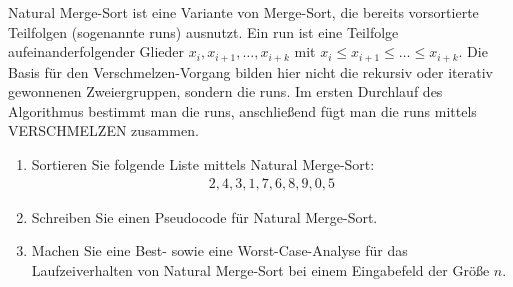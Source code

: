 
\begin{exercise}

Natural Merge-Sort ist eine Variante von Merge-Sort, die bereits vorsortierte Teilfolgen
(sogenannte runs) ausnutzt. Ein run ist eine Teilfolge aufeinanderfolgender Glieder $x_i, x_{i+1}, \dots, x_{i+k}$ mit $x_i \leq x_{i+1} \leq \dots \leq x_{i+k}$. Die Basis für den Verschmelzen-Vorgang bilden hier nicht
die rekursiv oder iterativ gewonnenen Zweiergruppen, sondern die runs. Im ersten Durchlauf des Algorithmus
bestimmt man die runs, anschließend fügt man die runs mittels VERSCHMELZEN zusammen.

\begin{enumerate}[label = (\alph*)]
  \item Sortieren Sie folgende Liste mittels Natural Merge-Sort:
  \begin{align}
    2,4,3,1,7,6,8,9,0,5
  \end{align}
  \item Schreiben Sie einen Pseudocode für Natural Merge-Sort.
  \item Machen Sie eine Best- sowie eine Worst-Case-Analyse für das Laufzeiverhalten von Natural Merge-Sort
  bei einem Eingabefeld der Größe $n$.
\end{enumerate}
\end{exercise}


